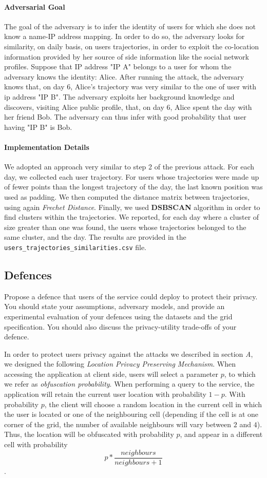 \documentclass[10pt,conference,compsocconf]{IEEEtran}
\begin{document}
\paragraph{Adversarial Goal}
The goal of the adversary is to infer the identity of users for which she does
not know a name-IP address mapping. In order to do so, the adversary looks for
similarity, on daily basis, on users trajectories, in order to exploit the
co-location information provided by her source of side information like the
social network profiles. Suppose that IP address "IP A" belongs to a user for
whom the adversary knows the identity: Alice. After running the attack, the
adversary knows that, on day 6, Alice's trajectory was very similar to the one
of user with ip address "IP B". The adversary exploits her background knowledge
and discovers, visiting Alice public profile, that, on day 6, Alice spent the
day with her friend Bob. The adversary can thus infer with good probability that
user having "IP B" is Bob.

\paragraph{Implementation Details}
We adopted an approach very similar to step 2 of the previous attack. For each
day, we collected each user trajectory. For users whose trajectories were made
up of fewer points than the longest trajectory of the day, the last known
position was used as padding. We then computed the distance matrix between
trajectories, using again \textit{Frechet Distance}. Finally, we used
\textbf{DSBSCAN} algorithm in order to find clusters within the trajectories. We
reported, for each day where a cluster of size greater than one was found, the
users whose trajectories belonged to the same cluster, and the day. The results
are provided in the \texttt{users\_trajectories\_similarities.csv} file.


\subsection{Defences}
Propose a defence that users of the service could deploy to protect their
privacy.  You should state your assumptions, adversary models, and provide an
experimental evaluation of your defences using the datasets and the grid
specification. You should also discuss the privacy-utility trade-offs of your
defence.

In order to protect users privacy against the attacks we described in section
\textit{A}, we designed the following \textit{Location Privacy Preserving
Mechanism}. When accessing the application at client side, users will select a
parameter $p$, to which we refer as \textit{obfuscation probability}. When
performing a query to the service, the application will retain the current user
location with probability $1-p$. With probability $p$, the client will choose a
random location in the current cell in which the user is located or one of the
neighbouring cell (depending if the cell is at one corner of the grid, the
number of available neighbours will vary between $2$ and $4$). Thus, the
location will be obfuscated with probability $p$, and appear in a different cell
with probability \[p*\frac{neighbours}{neighbours+1}\].
\end{document}
